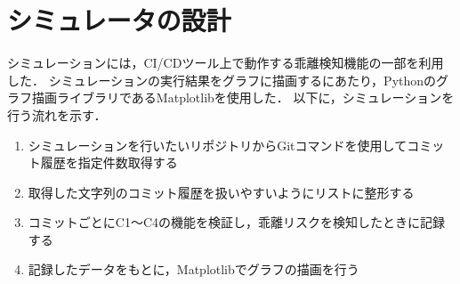 \section{シミュレータの設計}
シミュレーションには，CI/CDツール上で動作する乖離検知機能の一部を利用した．
シミュレーションの実行結果をグラフに描画するにあたり，Pythonのグラフ描画ライブラリであるMatplotlibを使用した．
以下に，シミュレーションを行う流れを示す．
\begin{enumerate}
    \item シミュレーションを行いたいリポジトリからGitコマンドを使用してコミット履歴を指定件数取得する
    \item 取得した文字列のコミット履歴を扱いやすいようにリストに整形する
    \item コミットごとにC1〜C4の機能を検証し，乖離リスクを検知したときに記録する
    \item 記録したデータをもとに，Matplotlibでグラフの描画を行う
\end{enumerate}